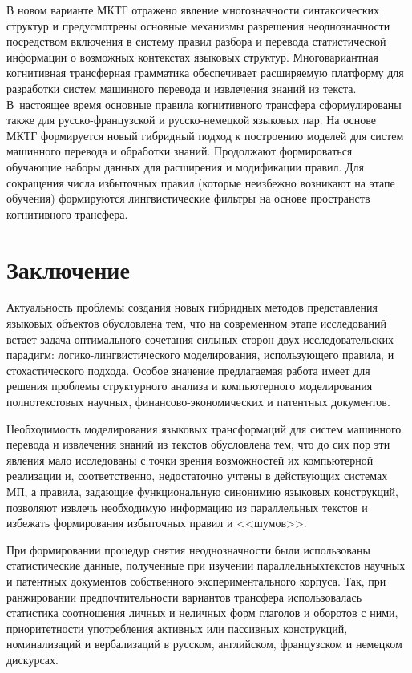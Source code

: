 \begin{multicols}{2}
     
     В новом варианте МКТГ отражено явление многозначности синтаксических 
структур и преду\-смот\-ре\-ны основные механизмы разрешения 
неоднозначности посредством включения в систему\linebreak
 правил разбора и 
перевода статистической информации о возможных контекстах языковых 
структур. Многовариантная когнитивная трансферная грамматика 
обеспечивает расширяемую платформу для разработки систем машинного 
перевода и извлечения знаний из текста. В~настоящее время основные 
правила когнитивного трансфера сформулированы также для 
     русско-французской и русско-немецкой языковых пар. На основе 
МКТГ формируется новый гибридный подход к построению моделей для 
систем машинного перевода и обработки знаний. Продолжают 
формироваться обучающие наборы данных для расширения и модификации 
правил. Для сокращения числа избыточных правил (которые неизбежно 
возникают на этапе обучения) формируются лингвистические фильтры на 
основе пространств когнитивного трансфера.
     
\section{Заключение}
     
     Актуальность проблемы создания новых гибридных методов 
представления языковых объектов обусловлена тем, что на современном 
этапе исследований встает задача оптимального сочетания сильных сторон 
двух исследовательских парадигм: логико-лингвистического моделирования, 
использующего правила, и стохастического подхода. Особое значение 
предлагаемая работа имеет для решения проблемы структурного анализа и 
компьютерного моделирования полнотекстовых научных, 
     финансово-экономических и патентных документов. 
     
     Необходимость моделирования языковых трансформаций для систем 
машинного перевода и извлечения знаний из текстов обусловлена тем, что до 
сих пор эти явления мало исследованы с точки зрения возможностей их 
компьютерной реализации и, соответственно, недостаточно учтены в 
действующих системах МП, а правила, задающие функциональную 
синонимию языковых конструкций, позволяют извлечь необходимую 
информацию из параллельных текстов и избежать формирования 
избыточных правил и <<шумов>>.
     
     При формировании процедур снятия неоднозначности были 
использованы статистические данные, полученные при изучении 
параллельных\linebreak текстов научных и патентных документов собственного 
экспериментального корпуса. Так, при ранжировании предпочтительности 
вариантов трансфера использовалась статистика соотношения личных и 
неличных форм глаголов и оборотов с ними, приоритетности употребления 
активных или пассивных конструкций, номинализаций и вербализаций в 
русском, английском, французском и немецком дискурсах.
     

\end{multicols}
